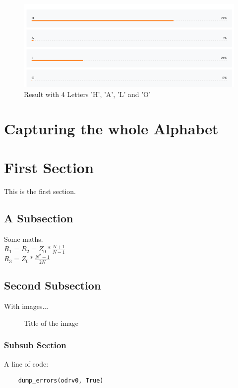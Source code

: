 \documentclass[a4paper,titlepage]{article}
\begin{document}
\begin{figure}[H]
    \includegraphics[width=\textwidth]{result_HALO.png}
    \caption{Result with 4 Letters 'H', 'A', 'L' and 'O'}
\end{figure}

\newpage
\section{Capturing the whole Alphabet}

\section{First Section}
This is the first section.

\subsection{A Subsection}
Some maths. \\

$R_{1} = R_{2} = Z_{0} * \frac{N + 1}{N - 1} $\\

$R_{3} = Z_{0} * \frac{N^2 - 1}{2N} $\\

\subsection{Second Subsection}

With images...

\begin{figure}[H]
    \caption{Title of the image}
\end{figure}

\subsubsection{Subsub Section}
A line of code:

\begin{lstlisting}
    dump_errors(odrv0, True)
\end{lstlisting}
\end{document}
